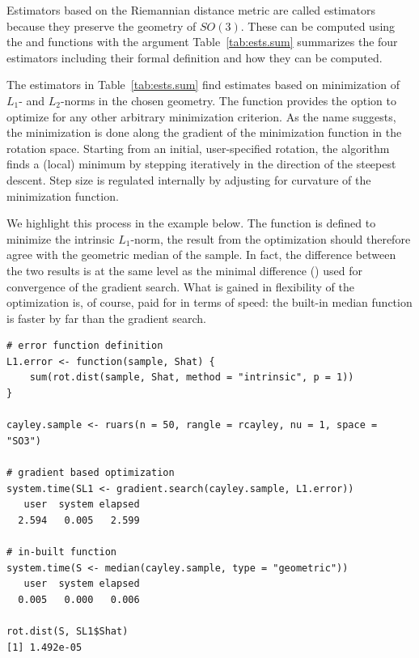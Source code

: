 Estimators based on the Riemannian distance metric are called  estimators because they preserve the geometry of $SO(3)$.  These can be computed using the  and  functions with the argument   Table~\ref{tab:ests.sum} summarizes the four estimators including their formal definition and how they can be computed.  


The estimators in Table~\ref{tab:ests.sum} find estimates  based on minimization of $L_1$- and $L_2$-norms in the chosen geometry. The  function  provides the option to optimize for any other arbitrary minimization criterion. As the name suggests, the minimization is done along the gradient of the minimization function in the rotation space. Starting from an initial, user-specified rotation, the algorithm finds a (local) minimum by stepping iteratively in the direction of the steepest descent. Step size is regulated internally by adjusting for curvature of the minimization function.

We highlight this process  in the example below. The function  is defined to minimize the intrinsic $L_1$-norm, the result from the optimization should therefore agree with the geometric median of the sample. In fact, the difference between the two results is at the same level as the minimal difference () used for convergence of the gradient search. What is gained in flexibility of the optimization is, of course, paid for in terms of speed: the built-in median function is faster by far than the gradient search. 

\begin{verbatim}
# error function definition
L1.error <- function(sample, Shat) {
    sum(rot.dist(sample, Shat, method = "intrinsic", p = 1))
}

cayley.sample <- ruars(n = 50, rangle = rcayley, nu = 1, space = "SO3")

# gradient based optimization
system.time(SL1 <- gradient.search(cayley.sample, L1.error))
   user  system elapsed 
  2.594   0.005   2.599 

# in-built function
system.time(S <- median(cayley.sample, type = "geometric"))
   user  system elapsed 
  0.005   0.000   0.006 
  
rot.dist(S, SL1$Shat)
[1] 1.492e-05
\end{verbatim}


